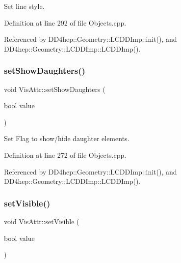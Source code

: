 Set line style. 



Definition at line 292 of file Objects.\+cpp.



Referenced by D\+D4hep\+::\+Geometry\+::\+L\+C\+D\+D\+Imp\+::init(), and D\+D4hep\+::\+Geometry\+::\+L\+C\+D\+D\+Imp\+::\+L\+C\+D\+D\+Imp().

\hypertarget{class_d_d4hep_1_1_geometry_1_1_vis_attr_af29f0854b9e6866b31830dd673f92df8}{}\label{class_d_d4hep_1_1_geometry_1_1_vis_attr_af29f0854b9e6866b31830dd673f92df8} 
\subsubsection{\texorpdfstring{set\+Show\+Daughters()}{setShowDaughters()}}
{\footnotesize\ttfamily void Vis\+Attr\+::set\+Show\+Daughters (\begin{DoxyParamCaption}\item[{bool}]{value }\end{DoxyParamCaption})}



Set Flag to show/hide daughter elements. 



Definition at line 272 of file Objects.\+cpp.



Referenced by D\+D4hep\+::\+Geometry\+::\+L\+C\+D\+D\+Imp\+::init(), and D\+D4hep\+::\+Geometry\+::\+L\+C\+D\+D\+Imp\+::\+L\+C\+D\+D\+Imp().

\hypertarget{class_d_d4hep_1_1_geometry_1_1_vis_attr_a499e3e8252f4abd62be3a3be521f10b4}{}\label{class_d_d4hep_1_1_geometry_1_1_vis_attr_a499e3e8252f4abd62be3a3be521f10b4} 
\subsubsection{\texorpdfstring{set\+Visible()}{setVisible()}}
{\footnotesize\ttfamily void Vis\+Attr\+::set\+Visible (\begin{DoxyParamCaption}\item[{bool}]{value }\end{DoxyParamCaption})}



